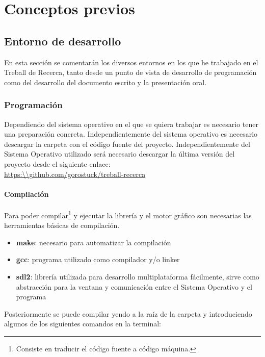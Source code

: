 \chapter{Conceptos previos}
\section{Entorno de desarrollo}
En esta sección se comentarán los diversos entornos en los que he trabajado en el Treball de Recerca, tanto desde un punto de vista de desarrollo de programación como del desarrollo del documento escrito y la presentación oral.
\subsection{Programación}
Dependiendo del sistema operativo en el que se quiera trabajar es necesario tener una preparación concreta. Independientemente del sistema operativo es necesario descargar la carpeta con el código fuente del proyecto. Independientemente del Sistema Operativo utilizado será necesario descargar la última versión del proyecto desde el siguiente enlace: \\ \url{https:\\github.com/gorostuck/treball-recerca}

\subsubsection{Compilación}
Para poder compilar\footnote{Consiste en traducir el código fuente a código máquina.} y ejecutar la librería y el motor gráfico son necesarias las herramientas básicas de compilación.
\begin{itemize}
\item{\textbf{make}: necesario para automatizar la compilación}
\item{\textbf{gcc}: programa utilizado como compilador y/o linker}
\item{\textbf{sdl2}: librería utilizada para desarrollo multiplataforma fácilmente, sirve como abstracción para la ventana y comunicación entre el Sistema Operativo y el programa}
\end{itemize}

Posteriormente se puede compilar yendo a la raíz de la carpeta y introduciendo algunos de los siguientes comandos en la terminal:

